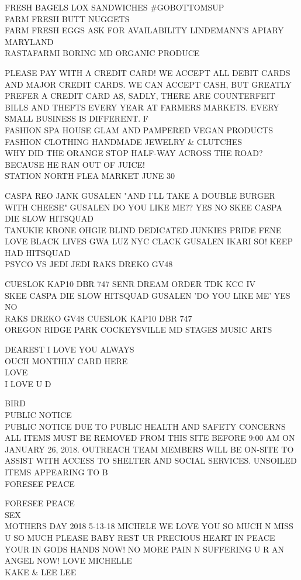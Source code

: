 \documentclass[10pt,letterpaper]{article}
\begin{document}
FRESH BAGELS LOX SANDWICHES \#GOBOTTOMSUP\\
FARM FRESH BUTT NUGGETS\\
FARM FRESH EGGS ASK FOR AVAILABILITY LINDEMANN'S APIARY MARYLAND\\
RASTAFARMI BORING MD ORGANIC PRODUCE

PLEASE PAY WITH A CREDIT CARD!  WE ACCEPT ALL DEBIT CARDS AND MAJOR CREDIT CARDS.  WE CAN ACCEPT CASH, BUT GREATLY PREFER A CREDIT CARD AS, SADLY, THERE ARE COUNTERFEIT BILLS AND THEFTS EVERY YEAR AT FARMERS MARKETS.  EVERY SMALL BUSINESS IS DIFFERENT.  F\\
FASHION SPA HOUSE GLAM AND PAMPERED VEGAN PRODUCTS FASHION CLOTHING HANDMADE JEWELRY \& CLUTCHES\\
WHY DID THE ORANGE STOP HALF{-}WAY ACROSS THE ROAD?  BECAUSE HE RAN OUT OF JUICE!\\
STATION NORTH FLEA MARKET JUNE 30

CASPA REO JANK GUSALEN "AND I'LL TAKE A DOUBLE BURGER WITH CHEESE" GUSALEN DO YOU LIKE ME?? YES NO SKEE CASPA DIE SLOW HITSQUAD\\
TANUKIE KRONE OHGIE BLIND DEDICATED JUNKIES PRIDE FENE\\
LOVE BLACK LIVES GWA LUZ NYC CLACK GUSALEN IKARI SO!  KEEP HAD HITSQUAD\\
PSYCO VS JEDI JEDI RAKS DREKO GV48

CUESLOK KAP10 DBR 747 SENR DREAM ORDER TDK KCC IV\\
SKEE CASPA DIE SLOW HITSQUAD GUSALEN 'DO YOU LIKE ME' YES NO\\
RAKS DREKO GV48 CUESLOK KAP10 DBR 747\\
OREGON RIDGE PARK COCKEYSVILLE MD STAGES MUSIC ARTS

DEAREST I LOVE YOU ALWAYS\\
OUCH MONTHLY CARD HERE\\
LOVE\\
I LOVE U D

BIRD\\
PUBLIC NOTICE\\
PUBLIC NOTICE DUE TO PUBLIC HEALTH AND SAFETY CONCERNS ALL ITEMS MUST BE REMOVED FROM THIS SITE BEFORE 9:00 AM ON JANUARY 26, 2018.  OUTREACH TEAM MEMBERS WILL BE ON{-}SITE TO ASSIST WITH ACCESS TO SHELTER AND SOCIAL SERVICES.  UNSOILED ITEMS APPEARING TO B\\
FORESEE PEACE

FORESEE PEACE\\
SEX\\
MOTHERS DAY 2018 5{-}13{-}18 MICHELE WE LOVE YOU SO MUCH N MISS U SO MUCH PLEASE BABY REST UR PRECIOUS HEART IN PEACE YOUR IN GODS HANDS NOW!  NO MORE PAIN N SUFFERING U R AN ANGEL NOW!  LOVE MICHELLE\\
KAKE \& LEE LEE
\end{document}
